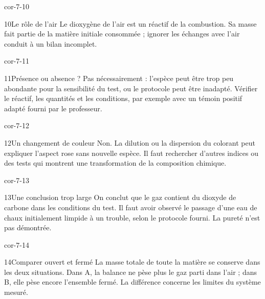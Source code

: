 \documentclass[12pt,twoside,openany]{book}
\begin{document}
\begin{blocLivre}{cor-7-10}
\begin{corrige}{10}{Le rôle de l’air}
Le dioxygène de l’air est un réactif de la combustion. Sa masse fait partie de la matière initiale consommée ; ignorer les échanges avec l’air conduit à un bilan incomplet.\par
\end{corrige}\end{blocLivre}
\begin{blocLivre}{cor-7-11}
\begin{corrige}{11}{Présence ou absence ?}
Pas nécessairement : l’espèce peut être trop peu abondante pour la sensibilité du test, ou le protocole peut être inadapté. Vérifier le réactif, les quantités et les conditions, par exemple avec un témoin positif adapté fourni par le professeur.\par
\end{corrige}\end{blocLivre}
\begin{blocLivre}{cor-7-12}
\begin{corrige}{12}{Un changement de couleur}
Non. La dilution ou la dispersion du colorant peut expliquer l’aspect rose sans nouvelle espèce. Il faut rechercher d’autres indices ou des tests qui montrent une transformation de la composition chimique.\par
\end{corrige}\end{blocLivre}
\begin{blocLivre}{cor-7-13}
\begin{corrige}{13}{Une conclusion trop large}
On conclut que le gaz contient du dioxyde de carbone dans les conditions du test. Il faut avoir observé le passage d’une eau de chaux initialement limpide à un trouble, selon le protocole fourni. La pureté n’est pas démontrée.\par
\end{corrige}\end{blocLivre}
\begin{blocLivre}{cor-7-14}
\begin{corrige}{14}{Comparer ouvert et fermé}
La masse totale de toute la matière se conserve dans les deux situations. Dans A, la balance ne pèse plus le gaz parti dans l’air ; dans B, elle pèse encore l’ensemble fermé. La différence concerne les limites du système mesuré.\par
\end{corrige}\end{blocLivre}
\end{document}
